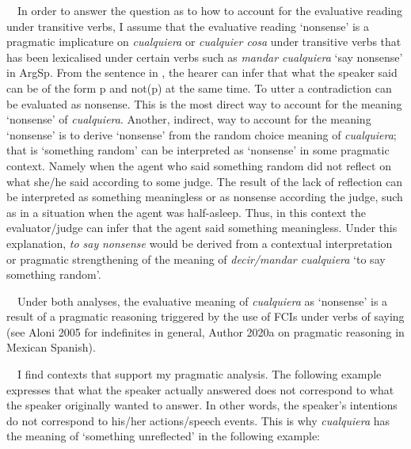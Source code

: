 \begin{styleStandard}
\ \ In order to answer the question as to how to account for the evaluative reading under transitive verbs, I assume that the evaluative reading ‘nonsense’ is a pragmatic implicature on \textit{cualquiera} or \textit{cualquier cosa} under transitive verbs that has been lexicalised under certain verbs such as \textit{mandar cualquiera} ‘say nonsense’ in ArgSp. From the sentence in , the hearer can infer that what the speaker said can be of the form p and not(p) at the same time. To utter a contradiction can be evaluated as nonsense. This is the most direct way to account for the meaning ‘nonsense’ of \textit{cualquiera}. Another, indirect, way to account for the meaning ‘nonsense’ is to derive ‘nonsense’ from the random choice meaning of \textit{cualquiera}; that is ‘something random’ can be interpreted as ‘nonsense’ in some pragmatic context. Namely when the agent who said something random did not reflect on what she/he said according to some judge. The result of the lack of reflection can be interpreted as something meaningless or as nonsense according the judge, such as in a situation when the agent was half-asleep. Thus, in this context the evaluator/judge can infer that the agent said something meaningless. Under this explanation, \textit{to say} \textit{nonsense} would be derived from a contextual interpretation or pragmatic strengthening of the meaning of \textit{decir/mandar cualquiera} ‘to say something random’. 
\end{styleStandard}

\begin{styleStandard}
\ \ Under both analyses, the evaluative meaning of \textit{cualquiera} as ‘nonsense’ is a result of a pragmatic reasoning triggered by the use of FCIs under verbs of saying (see Aloni 2005 for indefinites in general, Author 2020a on pragmatic reasoning in Mexican Spanish). 
\end{styleStandard}

\begin{styleStandard}
\ \ I find contexts that support my pragmatic analysis. The following example expresses that what the speaker actually answered does not correspond to what the speaker originally wanted to answer. In other words, the speaker’s intentions do not correspond to his/her actions/speech events. This is why \textit{cualquiera} has the meaning of ‘something unreflected’ in the following example:
\end{styleStandard}


